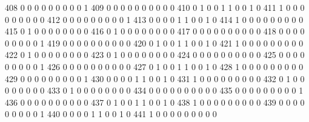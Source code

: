\documentclass[compress,8pt]{beamer}
\begin{document}
\begin{frame}
\begin{Schunk}
  408      0       0   0              0        0    0       0       0   0   1
  409      0       0   0              0        0    0       0       0   0   0
  410      0       1   0              0        1    1       0       0   1   0
  411      1       0   0              0        0    0       0       0   0   0
  412      0       0   0              0        0    0       0       0   0   1
  413      0       0   0              0        1    1       0       0   1   0
  414      1       0   0              0        0    0       0       0   0   0
  415      0       1   0              0        0    0       0       0   0   0
  416      0       1   0              0        0    0       0       0   0   0
  417      0       0   0              0        0    0       0       0   0   0
  418      0       0   0              0        0    0       0       0   0   1
  419      0       0   0              0        0    0       0       0   0   0
  420      0       1   0              0        1    1       0       0   1   0
  421      1       0   0              0        0    0       0       0   0   0
  422      0       1   0              0        0    0       0       0   0   0
  423      0       1   0              0        0    0       0       0   0   0
  424      0       0   0              0        0    0       0       0   0   0
  425      0       0   0              0        0    0       0       0   0   1
  426      0       0   0              0        0    0       0       0   0   0
  427      0       1   0              0        1    1       0       0   1   0
  428      1       0   0              0        0    0       0       0   0   0
  429      0       0   0              0        0    0       0       0   0   1
  430      0       0   0              0        1    1       0       0   1   0
  431      1       0   0              0        0    0       0       0   0   0
  432      0       1   0              0        0    0       0       0   0   0
  433      0       1   0              0        0    0       0       0   0   0
  434      0       0   0              0        0    0       0       0   0   0
  435      0       0   0              0        0    0       0       0   0   1
  436      0       0   0              0        0    0       0       0   0   0
  437      0       1   0              0        1    1       0       0   1   0
  438      1       0   0              0        0    0       0       0   0   0
  439      0       0   0              0        0    0       0       0   0   1
  440      0       0   0              0        1    1       0       0   1   0
  441      1       0   0              0        0    0       0       0   0   0

\end{Schunk}
\end{frame}
\end{document}
